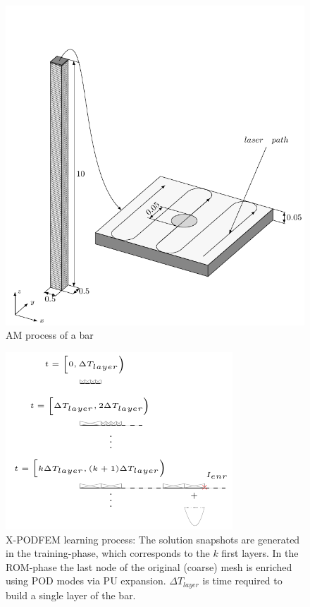 \documentclass[3p]{article}
\begin{document}
\begin{figure}[!h]
\centering
  \includegraphics[width=0.8\linewidth]{externals/Pictures/AMBar1D.pdf}
  \caption{AM process of a bar}
  \label{fig:AMBar1D}
  
\end{figure}

\begin{figure}[!h]

  \includegraphics[width=\linewidth]{externals/Pictures/OneDimensionalModelProcess.pdf}
  
 \caption{X-PODFEM learning process: The solution snapshots are generated in the training-phase, which corresponds to the $k$ first layers. In the ROM-phase the last node of the original (coarse) mesh is enriched using POD modes via PU expansion. $\Delta T_{layer}$ is time required to build a single layer of the bar.}
  
  \label{fig:XPODFEMProcess}
  
\end{figure}
\end{document}

